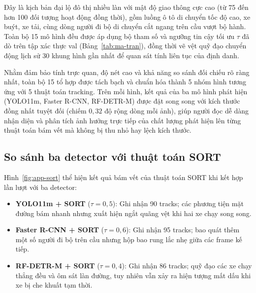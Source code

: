 \documentclass[fontsize=13pt,a4paper,oneside,parskip=false,numbers=noenddot,bibliography=totoc]{scrreprt}
\begin{document}
Đây là kịch bản đại lộ đô thị nhiều làn với mật độ giao thông cực cao (từ 75 đến hơn 100 đối tượng hoạt động đồng thời), gồm luồng ô tô di chuyển tốc độ cao, xe buýt, xe tải, cùng dòng người đi bộ di chuyển cắt ngang trên cầu vượt bộ hành. Toàn bộ 15 mô hình đều được áp dụng bộ tham số và ngưỡng tin cậy tối ưu $\tau$ đã dò trên tập xác thực val (Bảng~\ref{tab:ma-tran}), đồng thời vẽ vệt quỹ đạo chuyển động lịch sử 30 khung hình gần nhất để quan sát tính liên tục của định danh.

Nhằm đảm bảo tính trực quan, độ nét cao và khả năng so sánh đối chiếu rõ ràng nhất, toàn bộ 15 tổ hợp được tách bạch và chuẩn hóa thành 5 nhóm hình tương ứng với 5 thuật toán tracking. Trên mỗi hình, kết quả của ba mô hình phát hiện (YOLO11m, Faster R-CNN, RF-DETR-M) được đặt song song với kích thước đồng nhất tuyệt đối (chiếm $0{,}32$ độ rộng dòng mỗi ảnh), giúp người đọc dễ dàng nhận diện và phân tích ảnh hưởng trực tiếp của chất lượng phát hiện lên từng thuật toán bám vết mà không bị thu nhỏ hay lệch kích thước.

\subsection{So sánh ba detector với thuật toán SORT}
\label{sec:app-sort}
Hình~\ref{fig:app-sort} thể hiện kết quả bám vết của thuật toán SORT khi kết hợp lần lượt với ba detector:
\begin{itemize}
  \item \textbf{YOLO11m + SORT} ($\tau=0{,}5$): Ghi nhận 90 tracks; các phương tiện mặt đường bám nhanh nhưng xuất hiện ngắt quãng vệt khi hai xe chạy song song.
  \item \textbf{Faster R-CNN + SORT} ($\tau=0{,}6$): Ghi nhận 95 tracks; bao quát thêm một số người đi bộ trên cầu nhưng hộp bao rung lắc nhẹ giữa các frame kế tiếp.
  \item \textbf{RF-DETR-M + SORT} ($\tau=0{,}4$): Ghi nhận 86 tracks; quỹ đạo các xe chạy thẳng đều và ôm sát làn đường, tuy nhiên vẫn xảy ra hiện tượng mất dấu khi xe bị che khuất tạm thời.
\end{itemize}
\end{document}
